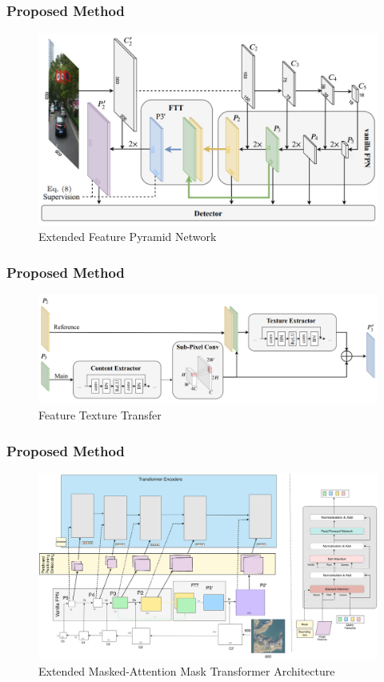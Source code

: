 \documentclass{beamer}
\begin{document}
\begin{frame}
  \frametitle{Proposed Method}
  \begin{figure}[h!]
    \centering
    \includegraphics[scale=0.15]{Figures/efpn.jpg}
    \caption{Extended Feature Pyramid Network}
    \label{fig:efpn}
  \end{figure}
\end{frame}


\begin{frame}
  \frametitle{Proposed Method}
  \begin{figure}[h!]
    \centering
    \includegraphics[scale=0.15]{Figures/ftt.png}
    \caption{Feature Texture Transfer}
    \label{fig:ftt}
  \end{figure}
\end{frame}

\begin{frame}
  \frametitle{Proposed Method}
  \begin{figure}[h!]
    \centering
    \includegraphics[scale=0.033]{Figures/EMAMT.png}
    \caption{Extended Masked-Attention Mask Transformer Architecture}
    \label{fig:proposed-model}
  \end{figure}
\end{frame}
\end{document}
